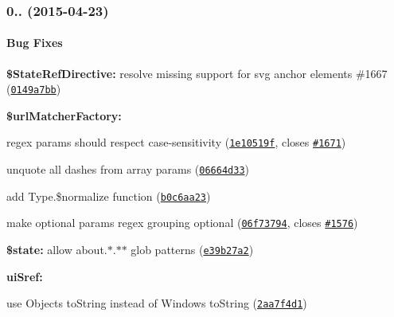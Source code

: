 {\bfseries {\bfseries {\bfseries \label{_0.2.14}%
 \subsubsection*{0.. (2015-\/04-\/23)}}}}

{\bfseries {\bfseries {\bfseries }}}

{\bfseries {\bfseries {\bfseries \paragraph*{Bug Fixes}}}}

{\bfseries {\bfseries {\bfseries }}}

{\bfseries {\bfseries {\bfseries 
\begin{DoxyItemize}
\item {\bfseries \$\+State\+Ref\+Directive\+:} resolve missing support for svg anchor elements \#1667 (\href{https://github.com/angular-ui/ui-router/commit/0149a7bb38b7af99388a1ad7cc9909a7b7c4439d}{\tt 0149a7bb})
\item {\bfseries \$url\+Matcher\+Factory\+:}
\begin{DoxyItemize}
\item regex params should respect case-\/sensitivity (\href{https://github.com/angular-ui/ui-router/commit/1e10519f3be6bbf0cefdcce623cd2ade06e649e5}{\tt 1e10519f}, closes \href{https://github.com/angular-ui/ui-router/issues/1671}{\tt \#1671})
\item unquote all dashes from array params (\href{https://github.com/angular-ui/ui-router/commit/06664d330f882390655dcfa83e10276110d0d0fa}{\tt 06664d33})
\item add Type.\$normalize function (\href{https://github.com/angular-ui/ui-router/commit/b0c6aa2350fdd3ce8483144774adc12f5a72b7e9}{\tt b0c6aa23})
\item make optional params regex grouping optional (\href{https://github.com/angular-ui/ui-router/commit/06f737945e83e668d09cfc3bcffd04a500ff1963}{\tt 06f73794}, closes \href{https://github.com/angular-ui/ui-router/issues/1576}{\tt \#1576})
\end{DoxyItemize}
\item {\bfseries \$state\+:} allow about.$\ast$.$\ast$$\ast$ glob patterns (\href{https://github.com/angular-ui/ui-router/commit/e39b27a2cb7d88525c446a041f9fbf1553202010}{\tt e39b27a2})
\item {\bfseries ui\+Sref\+:}
\begin{DoxyItemize}
\item use Object\textquotesingle{}s to\+String instead of Window\textquotesingle{}s to\+String (\href{https://github.com/angular-ui/ui-router/commit/2aa7f4d139dbd5b9fcc4afdcf2ab6642c87f5671}{\tt 2aa7f4d1})

\end{DoxyItemize}$$
\end{DoxyItemize}}}}
